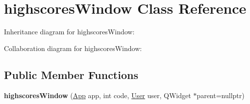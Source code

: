\hypertarget{classhighscoresWindow}{}\section{highscores\+Window Class Reference}
\label{classhighscoresWindow}


Inheritance diagram for highscores\+Window\+:


Collaboration diagram for highscores\+Window\+:
\subsection*{Public Member Functions}
\begin{DoxyCompactItemize}
\item 
\mbox{\label{classhighscoresWindow_a3d6f60b23b1c61f653cc9e75d390286b}} 
{\bfseries highscores\+Window} (\hyperlink{classApp}{App} app, int code, \hyperlink{classUser}{User} user, Q\+Widget $\ast$parent=nullptr)
\end{DoxyCompactItemize}
